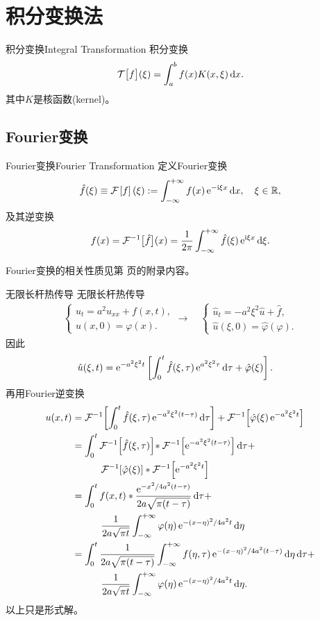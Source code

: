 \chapter{积分变换法}
\begin{definition}{积分变换}{Integral Transformation}
	积分变换
	\[
		\mathcal T\bigl[f\bigr](\xi)=\int_a^bf(x)K(x,\xi)\mathop{}\!\mathrm{d} x.
	\]
	其中$K$是核函数(kernel)。
\end{definition}
\section{Fourier变换}
\setcounter{subsubsection}{1}
\begin{definition}{Fourier变换}{Fourier Transformation}
	定义Fourier变换
	\[
		\hat f(\xi)\equiv\mathcal F_{\mathrm{{}}}\left[f\right](\xi):=\int_{-\infty}^{+\infty} f(x)\mathop{}\!\mathrm{e}^{-\mathrm{i}\xi x}\mathop{}\!\mathrm{d} x,\quad \xi\in\mathbb R,
	\]
	及其逆变换
	\[
		f(x)=\mathcal F^{-1}\big[\hat f\big](x)=\frac1{2\pi}\int_{-\infty}^{+\infty}\hat f(\xi)\mathop{}\!\mathrm{e}^{\mathrm{i}\xi x}\mathop{}\!\mathrm{d}\xi.
	\]
\end{definition}
Fourier变换的相关性质见第 \pageref{The Property of Fourier Transformation} 页的附录内容。
\begin{example}{无限长杆热传导}{}
	无限长杆热传导
	\begin{align*}
		\begin{cases}
			u_t=a^2u_{xx}+f(x,t),\\
			u(x,0)=\varphi(x).
		\end{cases}\longrightarrow\quad\begin{cases}
			\hat u_t=-a^2\xi^2\hat u+\hat f,\\
			\hat u(\xi,0)=\hat\varphi(\varphi).
		\end{cases}
	\end{align*}
	因此
	\begin{align*}
		\hat u(\xi,t)&=\mathop{}\!\mathrm{e}^{-a^2\xi^2t}\left[\int_0^t\hat f(\xi,\tau)\mathop{}\!\mathrm{e}^{a^2\xi^2\tau}\mathop{}\!\mathrm{d}\tau+\hat\varphi(\xi)\right].
	\end{align*}
	再用Fourier逆变换
	\begin{align*}
		u(x,t)&=\cfi{\int_0^t\hat f(\xi,\tau)\e{-a^2\xi^2(t-\tau)}\d\tau}+\cfi{\hat\varphi(\xi)\e{-a^2\xi^2t}}\\
		&=\int_0^t\cfi{\hat f(\xi,\tau)}\!\ast\cfi{\e{-a^2\xi^2(t-\tau)}}\d\tau+\\
		&\qqquad\cfi{\hat\varphi(\xi)}\ast\cfi{\e{-a^2\xi^2t}}\\
		&=\int_0^tf(x,t)\ast\frac{\e{-x^2/4a^2(t-\tau)}}{2a\sqrt{\pi(t-\tau)}}\d\tau+\\
		&\qqquad\frac1{2a\sqrt{\pi t}}\int\iti\varphi(\eta)\e{-(x-\eta)^2/4a^2t}\d\eta\\
		&=\int_0^t\frac1{2a\sqrt{\pi(t-\tau)}}\int\iti f(\eta,\tau)\e{-(x-\eta)^2/4a^2(t-\tau)}\d\eta\d\tau+\\
		&\qqquad\frac1{2a\sqrt{\pi t}}\int\iti\varphi(\eta)\e{-(x-\eta)^2/4a^2t}\d\eta.
	\end{align*}
	以上只是形式解。
\end{example}
